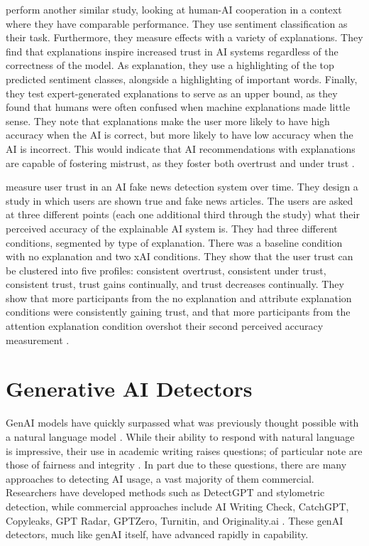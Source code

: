 \textcite{bansal_does_2021} perform another similar study, looking at human-AI cooperation in a context where they have comparable performance. They use sentiment classification as their task. Furthermore, they measure effects with a variety of explanations. They find that explanations inspire increased trust in AI systems regardless of the correctness of the model. As explanation, they use a highlighting of the top predicted sentiment classes, alongside a highlighting of important words. Finally, they test expert-generated explanations to serve as an upper bound, as they found that humans were often confused when machine explanations made little sense. They note that explanations make the user more likely to have high accuracy when the AI is correct, but more likely to have low accuracy when the AI is incorrect. This would indicate that AI recommendations with explanations are capable of fostering mistrust, as they foster both overtrust and under trust \cite{bansal_does_2021}.

\textcite{mohseni_trust_nodate} measure user trust in an AI fake news detection system over time. They design a study in which users are shown true and fake news articles. The users are asked at three different points (each one additional third through the study) what their perceived accuracy of the explainable AI system is. They had three different conditions, segmented by type of explanation. There was a baseline condition with no explanation and two xAI conditions. They show that the user trust can be clustered into five profiles: consistent overtrust, consistent under trust, consistent trust, trust gains continually, and trust decreases continually. They show that more participants from the no explanation and attribute explanation conditions were consistently gaining trust, and that more participants from the attention explanation condition overshot their second perceived accuracy measurement \cite{mohseni_trust_nodate}.

\section{Generative AI Detectors}
GenAI models have quickly surpassed what was previously thought possible with a natural language model \cite{brown_language_2020,chowdhery_palm_2022,openai_gpt-4_2023}. While their ability to respond with natural language is impressive, their use in academic writing raises questions; of particular note are those of fairness and integrity \cite{hu_challenges_2023}. In part due to these questions, there are many approaches to detecting AI usage, a vast majority of them commercial. Researchers have developed methods such as DetectGPT and stylometric detection, while commercial approaches include AI Writing Check, CatchGPT, Copyleaks, GPT Radar, GPTZero,  Turnitin, and Originality.ai \cite{mitchell_detectgpt_2023,kalpesh_krishna_paraphrasing_2023,tharindu_kumarage_stylometric_2023,gptzero_gptzero_2023,kirchner_new_2023}. These genAI detectors, much like genAI itself, have advanced rapidly in capability.

